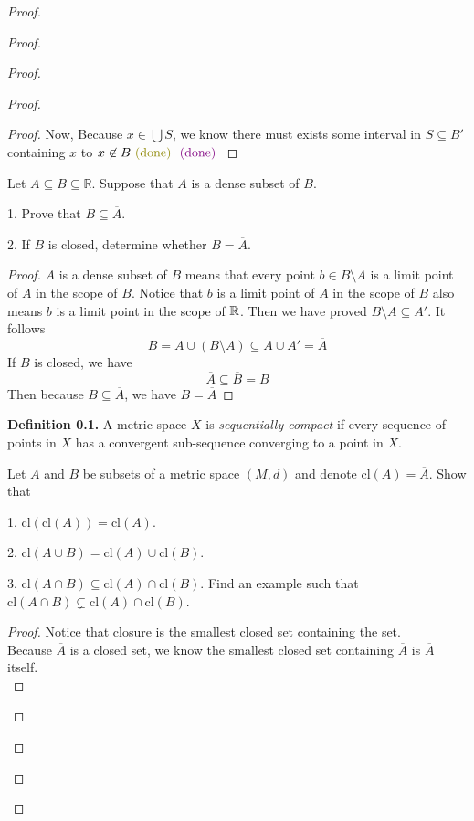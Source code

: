 \documentclass{report}
\begin{document}
\begin{proof}
\begin{proof}
\begin{proof}
\begin{proof}
\begin{proof}
Now, Because $x\in \bigcup S$, we know there must exists some interval in $S\subseteq B'$ containing  $x$  \CaC to $x\not\in B\odone\vdone$
\end{proof}
\begin{question}{}{}
Let \( A \subseteq B \subseteq \mathbb{R} \). Suppose that \( A \) is a dense subset of \( B \).

1. Prove that \( B \subseteq \overline{A} \).

2. If \( B \) is closed, determine whether \( B = \overline{A} \).
\end{question}
\begin{proof}
$A$ is a dense subset of $B$ means that every point $b\in B\setminus A$ is a limit point of $A$ in the scope of $B$. Notice that $b$ is a limit point of  $A$ in the scope of $B$ also means $b$ is a limit point in the scope of $\mathbb{R}$. Then we have proved $B\setminus A\subseteq A'$. It follows
\begin{equation}
B=A \cup (B\setminus A)\subseteq A\cup A'=\overline{A}
\end{equation}
If $B$ is closed, we have
 \begin{equation}
\overline{A}\subseteq \overline{B}=B
\end{equation}
Then because $B\subseteq \overline{A}$, we have $B=\overline{A}$



\end{proof}
\textbf{Definition 0.1.} A metric space \( X \) is \textit{sequentially compact} if every sequence of points in \( X \) has a convergent sub-sequence converging to a point in \( X \).
\begin{question}{}{}

Let \( A \) and \( B \) be subsets of a metric space \( (M, d) \) and denote \( \text{cl}(A) = \overline{A} \). Show that

1. \( \text{cl}(\text{cl}(A)) = \text{cl}(A) \).

2. \( \text{cl}(A \cup B) = \text{cl}(A) \cup \text{cl}(B) \).

3. \( \text{cl}(A \cap B) \subseteq \text{cl}(A) \cap \text{cl}(B) \). Find an example such that \( \text{cl}(A \cap B) \subsetneq \text{cl}(A) \cap \text{cl}(B) \).
\end{question}
\begin{proof}
Notice that closure is the smallest closed set containing the set.\\

Because $\overline{A}$ is a closed set, we know the smallest closed set containing $\overline{A}$ is $\overline{A}$ itself.\\


\end{proof}
\end{proof}
\end{proof}
\end{proof}
\end{proof}
\end{document}
